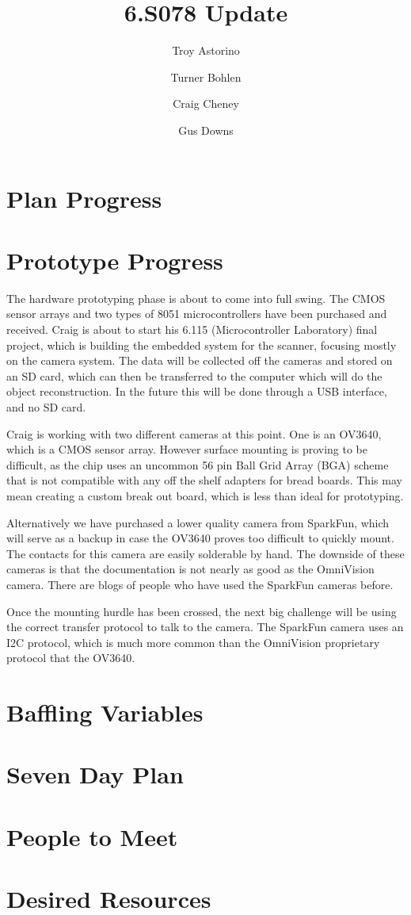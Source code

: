 \documentclass[10pt]{article}
\title{\vspace{-4em}6.S078 Update}
\author{Troy Astorino \and Turner Bohlen \and Craig Cheney \and Gus Downs}
\begin{document}
\maketitle
\vspace{-4em}

\section{Plan Progress}

\section{Prototype Progress}
The hardware prototyping phase is about to come into full swing. The CMOS sensor arrays and two types of 8051 microcontrollers have been purchased and received. Craig is about to start his 6.115 (Microcontroller Laboratory) final project, which is building the embedded system for the scanner, focusing mostly on the camera system. The data will be collected off the cameras and stored on an SD card, which can then be transferred to the computer which will do the object reconstruction. In the future this will be done through a USB interface, and no SD card.

Craig is working with two different cameras at this point. One is an OV3640, which is a CMOS sensor array. However surface mounting is proving to be difficult, as the chip uses an uncommon 56 pin Ball Grid Array (BGA) scheme that is not compatible with any off the shelf adapters for bread boards. This may mean creating a custom break out board, which is less than ideal for prototyping. 

Alternatively we have purchased a lower quality camera from SparkFun, which will serve as a backup in case the OV3640 proves too difficult to quickly mount. The contacts for this camera are easily solderable by hand. The downside of these cameras is that the documentation is not nearly as good as the OmniVision camera. There are blogs of people who have used the SparkFun cameras before. 

Once the mounting hurdle has been crossed, the next big challenge will be using the correct transfer protocol to talk to the camera. The SparkFun camera uses an I2C protocol, which is much more common than the OmniVision proprietary protocol that the OV3640. 

\section{Baffling Variables}

\section{Seven Day Plan}

\section{People to Meet}

\section{Desired Resources}
\end{document}
